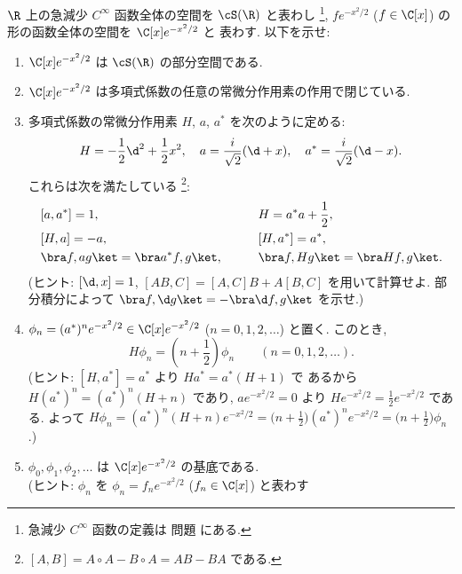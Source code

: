 \documentclass[12pt,twoside]{jarticle}
\begin{document}

\begin{question}[量子調和振動子]
\label{q:quantum-harmonic-oscillator}
  $\R$ 上の急減少 $C^\infty$ 函数全体の空間を $\cS(\R)$ と表わし%
  \footnote{急減少 $C^\infty$ 函数の定義は
    問題  にある.},
  $f e^{-x^2/2}$ ($f\in\C[x]$) の形の函数全体の空間を $\C[x]e^{-x^2/2}$ と
  表わす.  以下を示せ:
  \begin{enumerate}
  \item $\C[x]e^{-x^2/2}$ は $\cS(\R)$ の部分空間である.
  \item $\C[x]e^{-x^2/2}$ は多項式係数の任意の常微分作用素の作用で閉じている.
  \item 多項式係数の常微分作用素 $H$, $a$, $a^*$ を次のように定める:
    \begin{equation*}
      H = - \frac{1}{2}\d^2 + \frac{1}{2}x^2,
      \quad
      a = \frac{i}{\sqrt{2}}(\d + x),
      \quad
      a^* = \frac{i}{\sqrt{2}}(\d - x).
    \end{equation*}
    これらは次を満たしている%
    \footnote{$[A,B] = A\circ A - B\circ A = AB-BA$ である.}:
    \begin{alignat*}{2}
      &
      [a,a^*] = 1, 
      \qquad & &
      H = a^*a + \frac{1}{2},
      \\ &
      [H,a] = - a,
      \qquad & &
      [H,a^*] = a^*,
      \\ &
      \bra f,ag\ket = \bra a^*f,g\ket,
      \qquad & &
      \bra f,Hg\ket = \bra Hf,g\ket.
    \end{alignat*}
    (ヒント: $[\d,x]=1$, $[AB,C]=[A,C]B+A[B,C]$ を用いて計算せよ.
    部分積分によって $\bra f,\d g\ket = -\bra\d f,g\ket$ を示せ.)
  \item $\phi_n = (a^*)^n e^{-x^2/2}\in\C[x]e^{-x^2/2}$ 
    ($n=0,1,2,\ldots$) と置く.  このとき,
    \begin{equation*}
      H \phi_n = \left(n + \frac{1}{2}\right) \phi_n
      \qquad
      (n=0,1,2,\ldots).
    \end{equation*}
    (ヒント: $[H,a^*]=a^*$ より $Ha^*=a^*(H+1)$ で
    あるから $H(a^*)^n = (a^*)^n(H+n)$ であり, 
    $a e^{-x^2/2} = 0$ より $H e^{-x^2/2} = \frac{1}{2} e^{-x^2/2}$ 
    である.  よって $H\phi_n = (a^*)^n(H+n)e^{-x^2/2}
    =\bigl(n+\frac{1}{2}\bigr)(a^*)^ne^{-x^2/2}
    =\bigl(n+\frac{1}{2}\bigr)\phi_n$.)
  \item $\phi_0,\phi_1,\phi_2,\ldots$ は $\C[x]e^{-x^2/2}$ の基底である.
    \\(ヒント: $\phi_n$ を $\phi_n=f_n e^{-x^2/2}$ ($f_n\in\C[x]$) と表わす

\end{enumerate}
\end{question}
\end{document}
